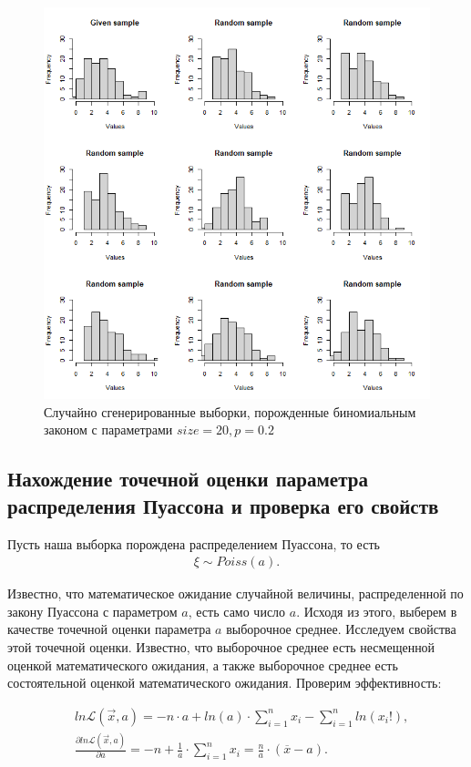 \documentclass[14pt,a4paper]{scrartcl}
\theoremstyle{definition}
\theoremstyle{remark}
\theoremstyle{definition}
\theoremstyle{definition}
\begin{document}
\begin{figure}[H]
  \includegraphics[width=\linewidth]{RPlotBinom.png}
  \caption{Случайно сгенерированные выборки, порожденные биномиальным законом с параметрами $size = 20, p = 0.2$}
  \label{fig:image3}
\end{figure}

\subsection{Нахождение точечной оценки параметра распределения Пуассона и проверка его свойств}

Пусть наша выборка порождена распределением Пуассона, то есть
\begin{align*}
  \xi \sim Poiss(a).
\end{align*}

Известно, что математическое ожидание случайной величины, распределенной по закону Пуассона с параметром $a$, есть само число $a$. Исходя из этого, выберем в качестве точечной оценки параметра $a$ выборочное среднее.
Исследуем свойства этой точечной оценки. Известно, что выборочное среднее есть несмещенной оценкой математического ожидания, а также выборочное среднее есть состоятельной оценкой математического ожидания. Проверим эффективность:

\begin{align*}
  &ln \mathcal{L}(\vec{x}, a) = -n\cdot a + ln(a)\cdot \sum_{i = 1}^{n} x_i - \sum_{i = 1}^{n} ln(x_i!), \\
  &\frac{\partial ln \mathcal{L}(\vec{x}, a)}{\partial a} = -n + \frac{1}{a}\cdot \sum_{i = 1}^{n} x_i = \frac{n}{a}\cdot (\overline{x} - a).
\end{align*}
\end{document}
